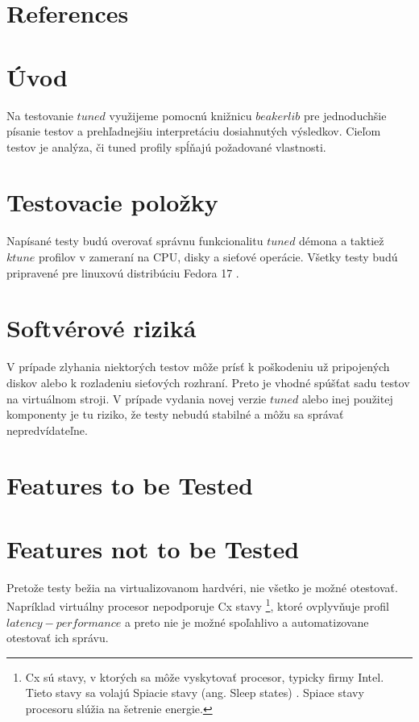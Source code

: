 \section{References}

\section{Úvod}
Na testovanie $tuned$ využijeme pomocnú knižnicu $beakerlib$
\cite{beakerlibHomepage} pre jednoduchšie písanie testov a prehľadnejšiu
interpretáciu dosiahnutých výsledkov. Cieľom testov je analýza, či tuned
profily spĺňajú požadované vlastnosti.

\section{Testovacie položky}
Napísané testy budú overovať správnu funkcionalitu $tuned$ démona a taktiež
$ktune$ profilov v zameraní na CPU, disky a sieťové operácie. Všetky testy budú
pripravené pre linuxovú distribúciu Fedora 17 \cite{fedoraHomepage}.

\section{Softvérové riziká}
V prípade zlyhania niektorých testov môže prísť k poškodeniu už pripojených
diskov alebo k rozladeniu sieťových rozhraní. Preto je vhodné spúšťat sadu
testov na virtuálnom stroji. V prípade vydania novej verzie $tuned$ alebo inej
použitej komponenty je tu riziko, že testy nebudú stabilné a môžu sa správať
nepredvídateľne.

\section{Features to be Tested}


\section{Features not to be Tested}
Pretože testy bežia na virtualizovanom hardvéri, nie všetko je možné otestovať.
Napríklad virtuálny procesor nepodporuje Cx stavy \footnote{Cx sú stavy, v
ktorých sa môže vyskytovať procesor, typicky firmy Intel. Tieto stavy sa volajú
Spiacie stavy (ang. Sleep states) \cite{sleepStates}. Spiace stavy procesoru
slúžia na šetrenie energie.}, ktoré ovplyvňuje profil $latency-performance$ a
preto nie je možné spoľahlivo a automatizovane otestovať ich správu.

